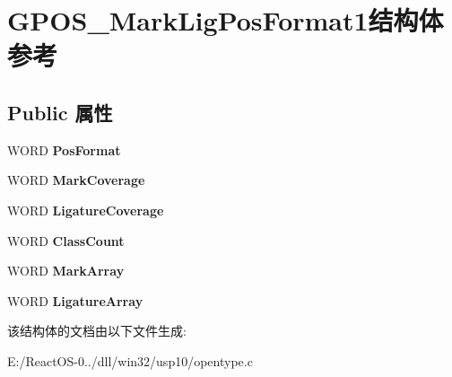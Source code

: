 \hypertarget{struct_g_p_o_s___mark_lig_pos_format1}{}\section{G\+P\+O\+S\+\_\+\+Mark\+Lig\+Pos\+Format1结构体 参考}
\label{struct_g_p_o_s___mark_lig_pos_format1}
\subsection*{Public 属性}
\begin{DoxyCompactItemize}
\item 
\mbox{\label{struct_g_p_o_s___mark_lig_pos_format1_a9f7e467ba8b01cb9ec4fce86db57019d}} 
W\+O\+RD {\bfseries Pos\+Format}
\item 
\mbox{\label{struct_g_p_o_s___mark_lig_pos_format1_a68ee5f09cf2deb608de48da1500d4be6}} 
W\+O\+RD {\bfseries Mark\+Coverage}
\item 
\mbox{\label{struct_g_p_o_s___mark_lig_pos_format1_a7ca3650dfc6ce05d3e702925929ff928}} 
W\+O\+RD {\bfseries Ligature\+Coverage}
\item 
\mbox{\label{struct_g_p_o_s___mark_lig_pos_format1_a3c78820ce9be00c2a24d53197237c9ed}} 
W\+O\+RD {\bfseries Class\+Count}
\item 
\mbox{\label{struct_g_p_o_s___mark_lig_pos_format1_a64319bd014671be5d7f325c0b22501b4}} 
W\+O\+RD {\bfseries Mark\+Array}
\item 
\mbox{\label{struct_g_p_o_s___mark_lig_pos_format1_ac503955956183c51c845afd19fe00d2a}} 
W\+O\+RD {\bfseries Ligature\+Array}
\end{DoxyCompactItemize}


该结构体的文档由以下文件生成\+:\begin{DoxyCompactItemize}
\item 
E\+:/\+React\+O\+S-\/0../dll/win32/usp10/opentype.\+c\end{DoxyCompactItemize}
